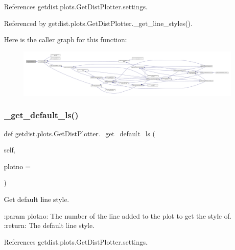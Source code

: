 References getdist.\+plots.\+Get\+Dist\+Plotter.\+settings.



Referenced by getdist.\+plots.\+Get\+Dist\+Plotter.\+\_\+get\+\_\+line\+\_\+styles().

Here is the caller graph for this function\+:
\nopagebreak
\begin{figure}[H]
\begin{center}
\leavevmode
\includegraphics[width=350pt]{classgetdist_1_1plots_1_1GetDistPlotter_abde32f397bb48f38fb3a99ec754c6487_icgraph}
\end{center}
\end{figure}
\mbox{\label{classgetdist_1_1plots_1_1GetDistPlotter_a3077b1755957ea13d90faa18e84af3d0}} 
\subsubsection{\texorpdfstring{\+\_\+get\+\_\+default\+\_\+ls()}{\_get\_default\_ls()}}
{\footnotesize\ttfamily def getdist.\+plots.\+Get\+Dist\+Plotter.\+\_\+get\+\_\+default\+\_\+ls (\begin{DoxyParamCaption}\item[{}]{self,  }\item[{}]{plotno = {} }\end{DoxyParamCaption})\hspace{0.3cm}{\ttfamily [private]}}

\begin{DoxyVerb}Get default line style.

:param plotno: The number of the line added to the plot to get the style of.
:return: The default line style.
\end{DoxyVerb}
 

References getdist.\+plots.\+Get\+Dist\+Plotter.\+settings.



